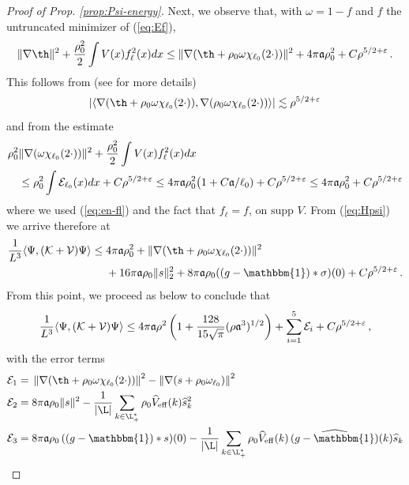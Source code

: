 \documentclass[a4paper,11pt]{article}
\def\cV{\mathcal{V}}
\def\cE{\mathcal{E}}
\def\cK{\mathcal{K}}
\def\eps{\varepsilon}
\numberwithin{equation}{section}
\def\aa{\mathfrak{a}}
\begin{document}
\begin{proof}[Proof of Prop. \ref{prop:Psi-energy}]
Next, we observe that, with $\omega = 1 - f$ and $f$ the untruncated minimizer of (\ref{eq:Ef}), 
\begin{equation}\label{eq:nabla-nu}
\| \nabla \th\|^2 +\frac{\rho_0^2}{2} \int V(x)f^2_\ell(x) dx \leq  \|\nabla (\th + {\rho_{0}}\omega \chi_{\ell_0} (2\cdot)) \|^2 + 4\pi \frak{a} \rho^2_0 + C \rho^{5/2+\eps} \,.
\end{equation}
This follows from (see \cite[Proof of Lemma 3.2]{BBCOS} for more details) \[ |\langle \nabla (\th + \rho_0 \omega \chi_{\ell_0} (2 \cdot) ) , \nabla (\rho_0 \omega \chi_{\ell_0} (2 \cdot)) \rangle| \lesssim \rho^{5/2+\eps} \]
and from the estimate
\[ \begin{split}  
\rho_0^2 & \| \nabla (\omega \chi_{\ell_0} (2 \cdot)) \|^2  +\frac{\rho_0^2}{2} \int V(x)f^2_\ell(x) dx \\
&\leq \rho_0^2 \int \cE_{\ell_0}(x) dx + C \rho^{5/2+\eps} \leq 4\pi \frak{a} \rho_0^2 \big( 1 + C \frak{a} / \ell_0) + C \rho^{5/2+\eps} \leq 4\pi \frak{a} \rho_0^2 + C \rho^{5/2+\eps}\end{split}  \]
where we used (\ref{eq:en-fl}) and the fact that $f_\ell = f$, on $\text{supp } V$. From (\ref{eq:Hpsi}) we arrive therefore at  
\[ \begin{split} \frac{1}{L^3} \langle \Psi, (\cK + \cV) \Psi \rangle \leq \; &4\pi \frak{a} \rho_0^2 +  
\|\nabla (\th + {\rho_{0}}\omega \chi_{\ell_0} (2\cdot)) \|^2 \\ &+ 16 \pi \aa \rho_0 \| s\|_2^2 + 8 \pi \aa \rho_0   ((g-\mathbbm{1}) \ast \sigma)(0) + C \rho^{5/2+\eps} \,.
\end{split} \]
From this point, we proceed as below \cite[Eq. (3.11)]{BBCOS} to conclude that 
\[\frac{1}{L^3} \langle \Psi, (\cK + \cV) \Psi \rangle \leq 4 \pi \frak{a} \rho^2 \left( 1 + \frac{128}{15 \sqrt{\pi}} (\rho \frak{a}^3)^{1/2} \right) + \sum_{i=1}^5 \mathcal{E}_i + C \rho^{5/2+\eps}\,, \]
with the error terms 
\begin{align*}
\mathcal{E}_1 =\; & \left\|\nabla (\th + {\rho_{0}}\omega \chi_{\ell_0} (2\cdot)) \right\|^2 - \left\|\nabla (s + {\rho_{0}}\omega_{\ell_0}) \right\|^2\\
  \mathcal{E}_2 =\; & 8\pi  \mathfrak{a} {\rho_0} \|s\|^2 -\frac{1}{|\L|}\sum_{k\in \L^*_+} \rho_0\widehat{V}_\mathrm{eff}(k)  \widehat s_k^2 \\
 \mathcal{E}_3 =\; & 8\pi  \mathfrak{a} \rho_0\,   ((g-\mathbbm{1}) \ast s)(0) - \frac{1}{|\L|}\sum_{k\in \L^*_+} \rho_0\widehat{V}_\mathrm{eff}(k)\,  \widehat{(g-\mathbbm{1})}(k) \widehat s_k \\

\end{align*}
\end{proof}
\end{document}
